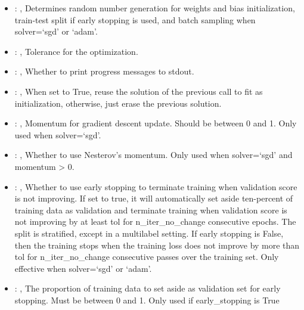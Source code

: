\begin{itemize}
    \item {}: ,
      Determines random number generation for weights and bias initialization,
      train-test split if early stopping is used, and batch sampling when solver=`sgd' or `adam'.

    \item {}: ,
      Tolerance for the optimization.

    \item {}: ,
      Whether to print progress messages to stdout.

    \item {}: ,
      When set to True, reuse the solution of the previous call to fit as initialization, otherwise,
      just erase the previous solution.

    \item {}: ,
      Momentum for gradient descent update. Should be between 0 and 1. Only used when solver=`sgd'.

    \item {}: ,
      Whether to use Nesterov's momentum. Only used when solver=`sgd' and momentum > 0.

    \item {}: ,
      Whether to use early stopping to terminate training when validation score is not improving.
      If set to true, it will automatically set aside ten-percent of training data as validation and
      terminate                                                  training when validation score is
      not improving by at least tol for n\_iter\_no\_change consecutive
      epochs. The split is stratified, except in a multilabel setting. If early stopping is False,
      then                                                  the training stops when the training
      loss does not improve by more than tol for n\_iter\_no\_change
      consecutive passes over the training set. Only effective when solver=`sgd' or `adam'.

    \item {}: ,
      The proportion of training data to set aside as validation set for early stopping. Must be
      between 0 and 1.                                                  Only used if early\_stopping
      is True


\end{itemize}
